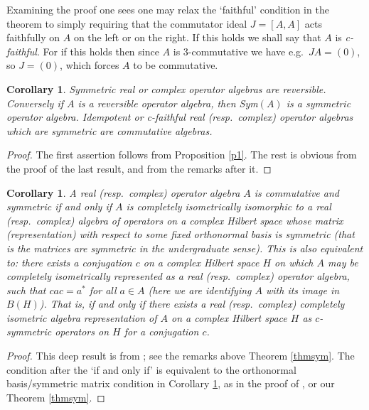 \documentclass{amsart}
\newtheorem{corollary}[theorem]{Corollary}
\theoremstyle{remark}
\theoremstyle{definition}
\numberwithin{equation}{section}
\begin{document}
\bigskip

Examining the proof one sees one may relax the 
`faithful' condition in the theorem to simply requiring that  the commutator ideal 
  $J = [A,A]$ acts faithfully on $A$ on the left or on the right.   If this holds we shall say that $A$ is {\em c-faithful}. 
  For if this holds then since $A$ is 3-commutative we have e.g.\ $JA = (0)$, so $J = (0)$, which forces $A$ to be commutative. 


    \begin{corollary} \label{comm}  Symmetric real or complex operator algebras are reversible.  
    Conversely if $A$ is a reversible 
    operator algebra, then Sym$(A)$ is a symmetric  operator algebra.    
    Idempotent or c-faithful real  (resp.\ complex)   operator algebras  which are 
    symmetric are commutative algebras.   \end{corollary}
     
     \begin{proof}  The first assertion follows from Proposition \ref{p1}. 
     The rest is obvious from the proof of the last result, and from the remarks after it. 
 \end{proof} 

  \begin{corollary} \label{chsym}  A  real  (resp.\ complex)
 operator algebra $A$  is commutative and symmetric if and only if $A$ is completely isometrically isomorphic 
 to a real  (resp.\ complex) algebra of 
 operators on a complex Hilbert space whose matrix (representation) with respect to some fixed orthonormal basis is 
symmetric  (that is the matrices are symmetric in the undergraduate sense). 
This is also equivalent to:
there exists a conjugation $c$ on a complex Hilbert space $H$ on which $A$ may be completely isometrically represented 
as a real  (resp.\ complex) operator algebra,  such that $c a c = a^*$ for all $a \in A$ (here we are identifying $A$ with its image in $B(H)$).
That is, if and only if  there exists a  real  (resp.\ complex) 
completely isometric algebra representation of $A$ on a complex Hilbert space $H$ as $c$-symmetric operators
on $H$ for a  conjugation $c$.    \end{corollary} 

  \begin{proof}  This deep result is
  from \cite{BWinv}; see the remarks above Theorem \ref{thmsym}.   The condition after the `if and only if' is equivalent to the orthonormal basis/symmetric matrix
  condition in Corollary \ref{comm}, as in the proof of \cite[Corollary 2.5]{BWinv}, or our Theorem \ref{thmsym}.   \end{proof} 
\end{document}
